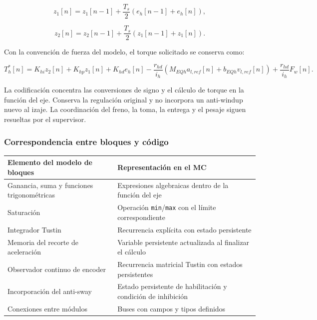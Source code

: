 \documentclass[a4paper,10pt,onecolumn,journal]{ieeeconf}
\numberwithin{equation}{section}
\begin{document}
\begin{equation}
z_1[n]=z_1[n-1]+\frac{T_s}{2}(e_h[n-1]+e_h[n]),
\end{equation}

\begin{equation}
z_2[n]=z_2[n-1]+\frac{T_s}{2}(z_1[n-1]+z_1[n]).
\end{equation}

Con la convención de fuerza del modelo, el torque solicitado se conserva como:

\begin{equation}
T_h^*[n]=K_{hi}z_2[n]+K_{hp}z_1[n]+K_{hd}e_h[n]
-\frac{r_{hd}}{i_h}\left(M_{EQh}a_{l,ref}[n]+b_{EQh}v_{l,ref}[n]\right)
+\frac{r_{hd}}{i_h}F_w[n].
\end{equation}

La codificación concentra las conversiones de signo y el cálculo de torque en la función del eje. Conserva la regulación original y no incorpora un anti-windup nuevo al izaje. La coordinación del freno, la toma, la entrega y el pesaje siguen resueltas por el supervisor.


\subsubsection{Correspondencia entre bloques y código}

\begin{table}[H]
\centering
{\small
\begin{tabular}{@{}L{0.34\textwidth}L{0.60\textwidth}@{}}
\toprule
Elemento del modelo de bloques & Representación en el MC\\
\midrule
Ganancia, suma y funciones trigonométricas & Expresiones algebraicas dentro de la función del eje\\
Saturación & Operación \texttt{min}/\texttt{max} con el límite correspondiente\\
Integrador Tustin & Recurrencia explícita con estado persistente\\
Memoria del recorte de aceleración & Variable persistente actualizada al finalizar el cálculo\\
Observador continuo de encoder & Recurrencia matricial Tustin con estados persistentes\\
Incorporación del anti-sway & Estado persistente de habilitación y condición de inhibición\\
Conexiones entre módulos & Buses con campos y tipos definidos\\
\bottomrule
\end{tabular}
}
\end{table}
\end{document}
